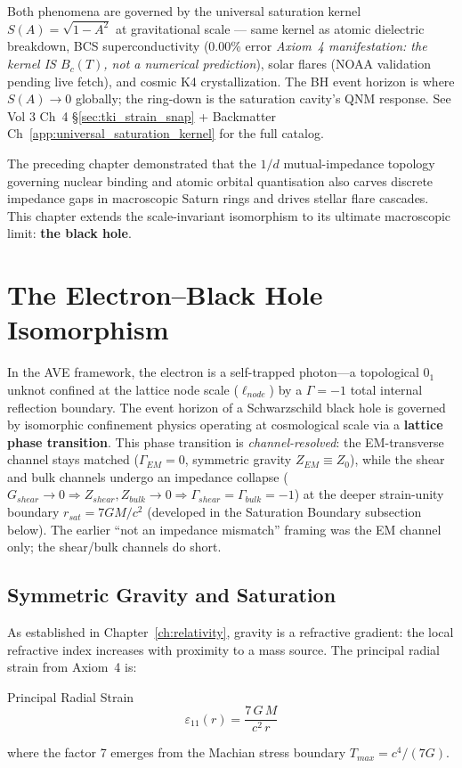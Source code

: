 Both phenomena are governed by the universal saturation kernel
$S(A) = \sqrt{1 - A^2}$ at gravitational scale --- same kernel as atomic
dielectric breakdown, BCS superconductivity (0.00\% error \textit{Axiom~4 manifestation: the kernel IS $B_c(T)$, not a numerical prediction}), solar flares
(NOAA validation pending live fetch), and cosmic K4 crystallization. The BH event horizon is
where $S(A) \to 0$ globally; the ring-down is the saturation cavity's
QNM response. See Vol 3 Ch~4 \S\ref{sec:tki_strain_snap} +
Backmatter Ch~\ref{app:universal_saturation_kernel} for the full catalog.

The preceding chapter demonstrated that the $1/d$ mutual-impedance topology governing nuclear binding and atomic orbital quantisation also carves discrete impedance gaps in macroscopic Saturn rings and drives stellar flare cascades. This chapter extends the scale-invariant isomorphism to its ultimate macroscopic limit: \textbf{the black hole}.

\section{The Electron--Black Hole Isomorphism}

In the AVE framework, the electron is a self-trapped photon---a topological $0_1$ unknot confined at the lattice node scale ($\ell_{node}$) by a $\Gamma = -1$\gammaundeclared{} total internal reflection boundary. The event horizon of a Schwarzschild black hole is governed by isomorphic confinement physics operating at cosmological scale via a \textbf{lattice phase transition}. This phase transition is \emph{channel-resolved}: the EM-transverse channel stays matched ($\Gamma_{EM} = 0$, symmetric gravity $Z_{EM} \equiv Z_0$), while the shear and bulk channels undergo an impedance collapse ($G_{shear} \to 0 \Rightarrow Z_{shear}, Z_{bulk} \to 0 \Rightarrow \Gamma_{shear} = \Gamma_{bulk} = -1$) at the deeper strain-unity boundary $r_{sat} = 7GM/c^2$ (developed in the Saturation Boundary subsection below). The earlier ``not an impedance mismatch'' framing was the EM channel only; the shear/bulk channels do short.

\subsection{Symmetric Gravity and Saturation}

As established in Chapter~\ref{ch:relativity}, gravity is a refractive gradient: the local refractive index increases with proximity to a mass source. The principal radial strain from Axiom~4 is:
\begin{resultbox}{Principal Radial Strain}
\begin{equation}
    \varepsilon_{11}(r) = \frac{7\,G\,M}{c^2\,r}
\end{equation}
\end{resultbox}
where the factor 7 emerges from the Machian stress boundary $T_{max} = c^4/(7G)$.

